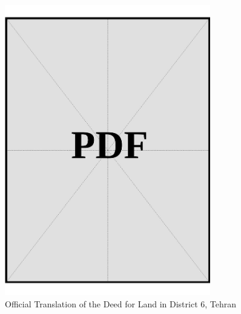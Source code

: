 \vspace*{\fill}
\begin{figure}[h]
    \centering
    \includegraphics[page=1, width=0.8\textwidth]{../application-docs/applicant/funds/property-deeds/property-1/official-translations.pdf}
    \caption{Official Translation of the Deed for Land in District 6, Tehran}
    \label{fig:applicant-land-dist6-tehran-official-translation}
\end{figure}
\vspace*{\fill}

\clearpage


